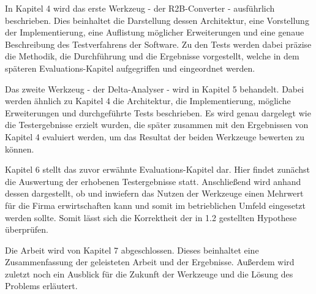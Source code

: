 \documentclass[12pt]{report}
\begin{document}
In Kapitel 4 wird das erste Werkzeug - der R2B-Converter - ausführlich beschrieben. Dies beinhaltet die Darstellung dessen Architektur, eine Vorstellung der Implementierung, eine Auflistung möglicher Erweiterungen und eine genaue Beschreibung des Testverfahrens der Software. Zu den Tests werden dabei präzise die Methodik, die Durchführung und die Ergebnisse vorgestellt, welche in dem späteren Evaluations-Kapitel aufgegriffen und eingeordnet werden. 

Das zweite Werkzeug - der Delta-Analyser - wird in Kapitel 5 behandelt. Dabei werden ähnlich zu Kapitel 4 die Architektur, die Implementierung, mögliche Erweiterungen und durchgeführte Tests beschrieben. Es wird genau dargelegt wie die Testergebnisse erzielt wurden, die später zusammen mit den Ergebnissen von Kapitel 4 evaluiert werden, um das Resultat der beiden Werkzeuge bewerten zu können. 

Kapitel 6 stellt das zuvor erwähnte Evaluations-Kapitel dar. Hier findet zunächst die Auswertung der erhobenen Testergebnisse statt.
Anschließend wird anhand dessen dargestellt, ob und inwiefern das Nutzen der Werkzeuge einen Mehrwert für die Firma erwirtschaften kann und somit im betrieblichen Umfeld eingesetzt werden sollte.  
Somit lässt sich die Korrektheit der in 1.2 gestellten Hypothese überprüfen.

Die Arbeit wird von Kapitel 7 abgeschlossen. Dieses beinhaltet eine Zusammenfassung der geleisteten Arbeit und der Ergebnisse. Außerdem wird zuletzt noch ein Ausblick für die Zukunft der Werkzeuge und die Lösung des Problems erläutert. 
\end{document}
